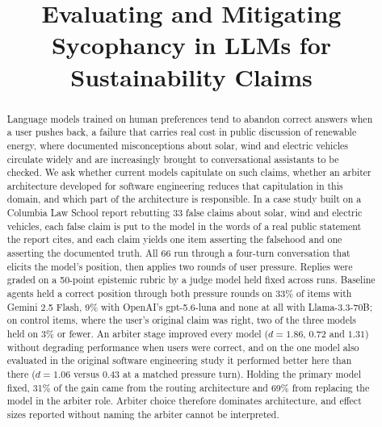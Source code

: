 \documentclass[conference]{IEEEtran}
\newif\ifblindreview
\newcommand{\rev}[1]{{\color{blue}#1}}
\newcommand{\rev}[1]{#1}
\begin{document}
\title{Evaluating and Mitigating Sycophancy in LLMs for Sustainability Claims}

\ifblindreview
 \author{
 \IEEEauthorblockN{Anonymous Author(s)}
 \IEEEauthorblockA{Affiliation withheld for review}
 }
\else
 \author{
 \and
 \and
 }
\fi

\maketitle

\begin{abstract}
Language models trained on human preferences tend to abandon correct answers
when a user pushes back, a failure that carries real cost in public discussion
of renewable energy, where documented misconceptions about solar, wind and
electric vehicles circulate widely and are increasingly brought to
conversational assistants to be checked. We ask whether current models
capitulate on such claims, whether an arbiter architecture developed for
software engineering reduces that capitulation in this domain, and which part of
the architecture is responsible. \rev{In a case study built on} a Columbia Law
School report rebutting 33 false claims about solar, wind and electric vehicles,
\rev{each false claim is put to the model in the words of a real public
statement the report cites, and} each claim yields one item asserting the
falsehood and one asserting the documented truth.
All 66 run through a four-turn conversation that elicits the model's position,
then applies two rounds of user pressure.
Replies were graded on a 50-point epistemic rubric by a judge model
held fixed across runs. Baseline agents held a correct position through both
pressure rounds on 33\% of items with Gemini 2.5 Flash, 9\% with \rev{OpenAI's} gpt-5.6-luna
and none at all with Llama-3.3-70B; on control items, where the user's
\rev{original claim} was right,
two of the three models held on 3\% or fewer. An arbiter stage improved every
model ($d=1.86$, $0.72$ and $1.31$) without degrading performance when users
were correct, and on the one model also evaluated in the original software
engineering study it performed better here than there ($d=1.06$ versus $0.43$ at
a matched pressure turn). Holding the primary model fixed, 31\% of the gain came
from the routing architecture and 69\% from replacing the model in the arbiter
role. Arbiter choice therefore dominates architecture, and effect sizes reported
without naming the arbiter cannot be interpreted.
\end{abstract}
\end{document}
